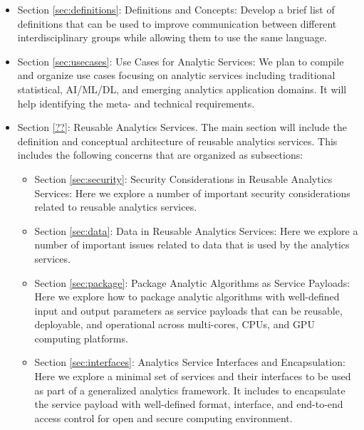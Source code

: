 \begin{itemize}
  
\item Section \ref{sec:definitions}: Definitions and Concepts: Develop
  a brief list of definitions that can be used to improve
  communication between different interdisciplinary groups while
  allowing them to use the same language.

\item Section \ref{sec:usecases}: Use Cases for Analytic Services: We plan to
  compile and organize use cases focusing on analytic services
  including traditional statistical, AI/ML/DL, and emerging analytics
  application domains. It will help identifying the meta- and
  technical requirements.

\item Section \ref{??}: Reusable Analytics Services. The main section
  will include the definition and conceptual architecture of reusable
  analytics services. This includes the following concerns that are
  organized as subsections:
  
  \begin{itemize}
    
  \item Section \ref{sec:security}: Security Considerations in Reusable
    Analytics Services: Here we explore a number of important security
    considerations related to reusable analytics services.

  \item Section \ref{sec:data}: Data in Reusable Analytics Services: Here we
    explore a number of important issues related to data that is used
    by the analytics services.

  \item Section \ref{sec:package}: Package Analytic Algorithms as Service
    Payloads: Here we explore how to package analytic algorithms with
    well-defined input and output parameters as service payloads that
    can be reusable, deployable, and operational across multi-cores,
    CPUs, and GPU computing platforms.

  \item Section \ref{sec:interfaces}: Analytics Service Interfaces and
    Encapsulation: Here we explore a minimal set of services and their
    interfaces to be used as part of a generalized analytics
    framework. It includes to encapsulate the service payload with
    well-defined format, interface, and end-to-end access control for
    open and secure computing environment.
  

\end{itemize}
\end{itemize}

